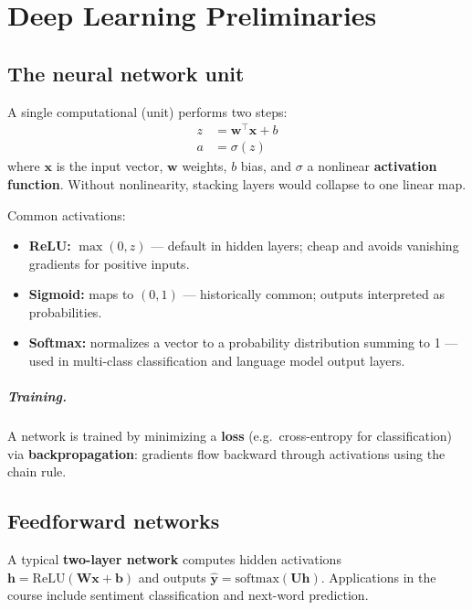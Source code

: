 \chapter{Deep Learning Preliminaries}
\label{ch:deeplearning}


\section{The neural network unit}

A single computational  (unit) performs two steps:
\begin{align*}
z &= \mathbf{w}^\top \mathbf{x} + b \\
a &= \sigma(z)
\end{align*}
where $\mathbf{x}$ is the input vector, $\mathbf{w}$ weights, $b$ bias, and $\sigma$ a nonlinear \textbf{activation function}. Without nonlinearity, stacking layers would collapse to one linear map.

Common activations:
\begin{itemize}
  \item \textbf{ReLU:} $\max(0, z)$ --- default in hidden layers; cheap and avoids vanishing gradients for positive inputs.
  \item \textbf{Sigmoid:} maps to $(0,1)$ --- historically common; outputs interpreted as probabilities.
  \item \textbf{Softmax:} normalizes a vector to a probability distribution summing to 1 --- used in multi-class classification and language model output layers.
\end{itemize}

\paragraph{Training.} A network is trained by minimizing a \textbf{loss} (e.g.\ cross-entropy for classification) via \textbf{backpropagation}: gradients flow backward through activations using the chain rule. 

\section{Feedforward networks}

A typical \textbf{two-layer network} computes hidden activations $\mathbf{h} = \mathrm{ReLU}(\mathbf{W}\mathbf{x}+\mathbf{b})$ and outputs $\hat{\mathbf{y}} = \mathrm{softmax}(\mathbf{U}\mathbf{h})$. Applications in the course include sentiment classification and next-word prediction.

